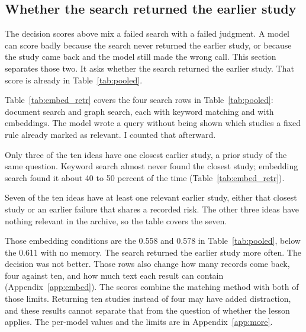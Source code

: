 \documentclass[11pt]{article}
\begin{document}
\subsection{Whether the search returned the earlier study}
\label{sec:embed}

The decision scores above mix a failed search with a failed judgment. A model can score badly because the search never returned the earlier study, or because the study came back and the model still made the wrong call. This section separates those two. It asks whether the search returned the earlier study. That score is already in Table~\ref{tab:pooled}.

Table~\ref{tab:embed_retr} covers the four search rows in Table~\ref{tab:pooled}: document search and graph search, each with keyword matching and with embeddings. The model wrote a query without being shown which studies a fixed rule already marked as relevant. I counted that afterward.

Only three of the ten ideas have one closest earlier study, a prior study of the same question. Keyword search almost never found the closest study; embedding search found it about 40 to 50 percent of the time (Table~\ref{tab:embed_retr}).

Seven of the ten ideas have at least one relevant earlier study, either that closest study or an earlier failure that shares a recorded risk. The other three ideas have nothing relevant in the archive, so the table covers the seven.

Those embedding conditions are the 0.558 and 0.578 in Table~\ref{tab:pooled}, below the 0.611 with no memory. The search returned the earlier study more often. The decision was not better. Those rows also change how many records come back, four against ten, and how much text each result can contain (Appendix~\ref{app:embed}). The scores combine the matching method with both of those limits. Returning ten studies instead of four may have added distraction, and these results cannot separate that from the question of whether the lesson applies. The per-model values and the limits are in Appendix~\ref{app:more}.
\end{document}
